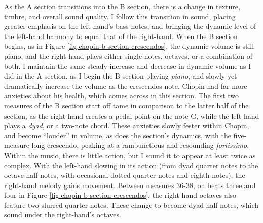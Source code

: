 As the A section transitions into the B section, there is a change in texture, timbre, and overall sound quality. I follow this transition in sound, placing greater emphasis on the left-hand's bass notes, and bringing the dynamic level of the left-hand harmony to equal that of the right-hand. When the B section begins, as in Figure \ref{fig:chopin-b-section-crescendos}\autocite{Hansen_1973}, the dynamic volume is still piano, and the right-hand plays either single notes, octaves, or a combination of both. I maintain the same steady increase and decrease in dynamic volume as I did in the A section, as I begin the B section playing \textit{piano}, and slowly yet dramatically increase the volume as the crescendos note. Chopin had far more anxieties about his health, which comes across in this section. The first two measures of the B section start off tame in comparison to the latter half of the section, as the right-hand creates a pedal point on the note G\musSharp{}, while the left-hand plays a \textit{dyad}, or a two-note chord. These anxieties slowly fester within Chopin, and become ``louder'' in volume, as does the section's dynamics, with the five-measure long crescendo, peaking at a rambunctious and resounding \textit{fortissimo}. Within the music, there is little action, but I sound it to appear at least twice as complex. With the left-hand slowing in its action (from dyad quarter notes to the octave half notes, with occasional dotted quarter notes and eighth notes), the right-hand melody gains movement. Between measures 36-38, on beats three and four in Figure \ref{fig:chopin-b-section-crescendos}\autocite{Hansen_1973}, the right-hand octaves also feature two slurred quarter notes. These change to become dyad half notes, which sound under the right-hand's octaves. 

